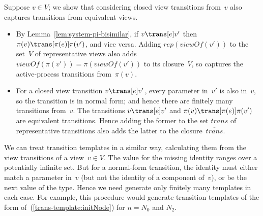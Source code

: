 Suppose $v \in V$; we show that considering closed view transitions from~$v$
also captures transitions from equivalent views.
%
\begin{itemize}
\item By Lemma~\ref{lem:system-pi-bisimilar}, if $v \trans[e] v'$ then $\pi(v)
  \trans[\pi(e)] \pi(v')$, and vice versa.  Adding $rep(viewOf(v'))$ to the
  set~$V$ of representative views also adds $viewOf(\pi(v')) =
  \pi(viewOf(v'))$ to its closure~$\overline{V}$, so captures the
  active-process transitions from~$\pi(v)$.

\item For a closed view transition $v \trans[e] v'$, every parameter in~$v'$
  is also in~$v$, so the transition is in normal form; and hence there are
  finitely many  transitions from~$v$.  The transitions $v \trans[e] v'$
  and $\pi(v) \trans[\pi(e)] \pi(v')$ are equivalent transitions.  Hence
  adding the former to the set $trans$ of representative transitions also adds
  the latter to the closure~$\overline{trans}$.
\end{itemize}



We can treat transition templates in a similar way, calculating them from the
view transitions of a view~$v \in V$.  The value for the missing identity
ranges over a potentially infinite set.  But for a normal-form transition, the
identity must either match a parameter in~$v$ (but not the identity of a
component of~$v$), or be the next value of the type.  Hence we need generate
only finitely many templates in each case.  
For example, this procedure would generate transition templates of the form
of~(\ref{trans-template:initNode}) for $n = N_0$ and $N_2$.


